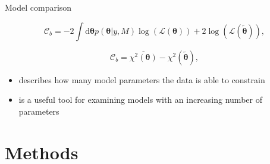 \documentclass[11pt,aspectratio=1610,dvipsnames]{beamer}
\begin{document}
\begin{frame}{Model comparison}

	\begin{tcolorbox}[colback=black!5,colframe=gray!15!black,title=\textsc{Bayesian} complexity] 
		\begin{equation}\label{eq:Bayes_Complexity}
			\mathcal{C}_b=-2\int \text{d}\boldsymbol{\theta} p(\boldsymbol{\theta}|y,M)\log(\mathcal{L}(\boldsymbol{\theta}))+2\log(\mathcal{L}(\boldsymbol{\tilde{\theta}})),
		\end{equation}
	
		\begin{equation}\label{eq:Bayes_Complexity_alt}
		\mathcal{C}_b=\overline{\chi^2(\boldsymbol{\theta})}-\chi^2(\boldsymbol{\tilde{\theta}}),
	\end{equation}
	\end{tcolorbox}

\begin{itemize}
	\item describes how many model parameters the data is able to constrain 
	\item is a useful tool for examining models with an increasing number of parameters
\end{itemize}
\raggedleft
\citet{kunz}
\end{frame}

\section{Methods}
\end{document}
